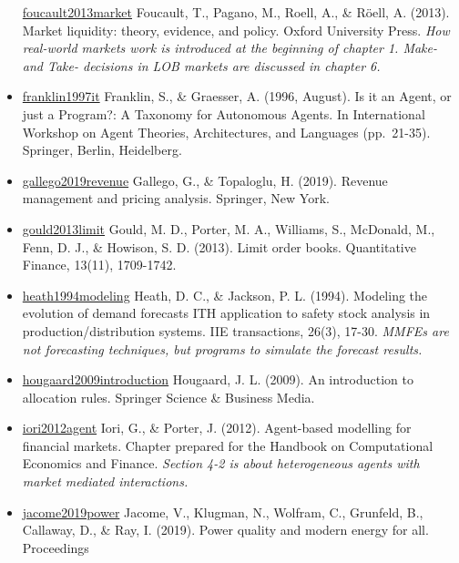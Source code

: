 \documentclass[letterpaper,8pt,twocolumn,twoside,]{pinp}
\begin{document}
\begin{itemize}
  \href{https://www.oxfordscholarship.com/view/10.1093/acprof:oso/9780199936243.001.0001/acprof-9780199936243}{foucault2013market}
  Foucault, T., Pagano, M., Roell, A., \& Röell, A. (2013). Market
  liquidity: theory, evidence, and policy. Oxford University Press.
  \emph{How real-world markets work is introduced at the beginning of
  chapter 1. Make- and Take- decisions in LOB markets are discussed in
  chapter 6.}
\item
  \href{https://link.springer.com/chapter/10.1007/BFb0013570}{franklin1997it}
  Franklin, S., \& Graesser, A. (1996, August). Is it an Agent, or just
  a Program?: A Taxonomy for Autonomous Agents. In International
  Workshop on Agent Theories, Architectures, and Languages (pp.~21-35).
  Springer, Berlin, Heidelberg.
\item
  \href{https://link.springer.com/book/10.1007/978-1-4939-9606-3}{gallego2019revenue}
  Gallego, G., \& Topaloglu, H. (2019). Revenue management and pricing
  analysis. Springer, New York.
\item
  \href{https://www.tandfonline.com/doi/abs/10.1080/14697688.2013.803148}{gould2013limit}
  Gould, M. D., Porter, M. A., Williams, S., McDonald, M., Fenn, D. J.,
  \& Howison, S. D. (2013). Limit order books. Quantitative Finance,
  13(11), 1709-1742.
\item
  \href{https://www.tandfonline.com/doi/abs/10.1080/07408179408966604}{heath1994modeling}
  Heath, D. C., \& Jackson, P. L. (1994). Modeling the evolution of
  demand forecasts ITH application to safety stock analysis in
  production/distribution systems. IIE transactions, 26(3), 17-30.
  \emph{MMFEs are not forecasting techniques, but programs to simulate
  the forecast results.}
\item
  \href{https://link.springer.com/book/10.1007/978-3-642-01828-2}{hougaard2009introduction}
  Hougaard, J. L. (2009). An introduction to allocation rules. Springer
  Science \& Business Media.
\item
  \href{https://www.oxfordhandbooks.com/view/10.1093/oxfordhb/9780199844371.001.0001/oxfordhb-9780199844371-e-43}{iori2012agent}
  Iori, G., \& Porter, J. (2012). Agent-based modelling for financial
  markets. Chapter prepared for the Handbook on Computational Economics
  and Finance. \emph{Section 4-2 is about heterogeneous agents with
  market mediated interactions.}
\item
  \href{https://www.pnas.org/content/116/33/16308}{jacome2019power}
  Jacome, V., Klugman, N., Wolfram, C., Grunfeld, B., Callaway, D., \&
  Ray, I. (2019). Power quality and modern energy for all. Proceedings

\end{itemize}
\end{document}

